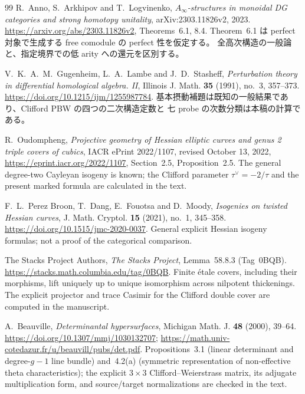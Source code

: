 \begin{thebibliography}{99}
R.~Anno, S.~Arkhipov and T.~Logvinenko,
\emph{$A_\infty$-structures in monoidal DG categories and strong homotopy unitality},
arXiv:2303.11826v2, 2023.
\url{https://arxiv.org/abs/2303.11826v2}, Theorems~6.1, 8.4.
Theorem~6.1 は perfect 対象で生成する free comodule の perfect 性を仮定する。
全高次構造の一般論と、指定境界での低 arity への還元を区別する。


V.~K.~A.~M.~Gugenheim, L.~A.~Lambe and J.~D.~Stasheff,
\emph{Perturbation theory in differential homological algebra. II},
Illinois J. Math. \textbf{35} (1991), no.~3, 357--373.
\url{https://doi.org/10.1215/ijm/1255987784}.
基本摂動補題は既知の一般結果であり、Clifford PBW の四つの二次構造定数と
七 probe の次数分類は本稿の計算である。


R.~Oudompheng,
\emph{Projective geometry of Hessian elliptic curves and genus 2 triple covers of cubics},
IACR ePrint 2022/1107, revised October 13, 2022,
\url{https://eprint.iacr.org/2022/1107}, Section~2.5, Proposition~2.5.
The general degree-two Cayleyan isogeny is known; the Clifford parameter
$\tau^\vee=-2/\tau$ and the present marked formula are calculated in the text.

F.~L.~Perez Broon, T.~Dang, E.~Fouotsa and D.~Moody,
\emph{Isogenies on twisted Hessian curves},
J. Math. Cryptol. \textbf{15} (2021), no.~1, 345--358.
\url{https://doi.org/10.1515/jmc-2020-0037}.
General explicit Hessian isogeny formulas; not a proof of the categorical comparison.


The Stacks Project Authors,
\emph{The Stacks Project}, Lemma~58.8.3 (Tag~0BQB).
\url{https://stacks.math.columbia.edu/tag/0BQB}.
Finite \'etale covers, including their morphisms, lift uniquely
up to unique isomorphism across nilpotent thickenings.
The explicit projector and trace Casimir for the Clifford double
cover are computed in the manuscript.


A.~Beauville,
\emph{Determinantal hypersurfaces},
Michigan Math. J. \textbf{48} (2000), 39--64.
\url{https://doi.org/10.1307/mmj/1030132707};
\url{https://math.univ-cotedazur.fr/u/beauvill/pubs/det.pdf}.
Propositions~3.1 (linear determinant and degree-$g-1$ line bundle)
and~4.2(a) (symmetric representation of non-effective theta characteristics);
the explicit $3\times3$ Clifford--Weierstrass matrix, its adjugate
multiplication form, and source/target normalizations are checked in the text.


\end{thebibliography}
